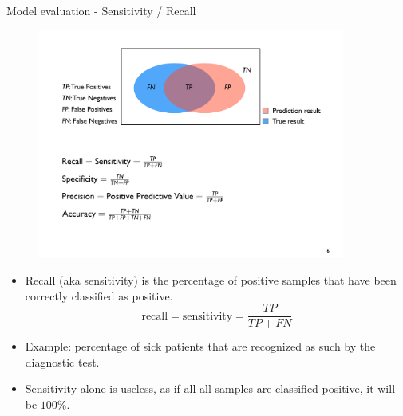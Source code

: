 \documentclass[xcolor=pdftex,dvipsnames,table]{beamer}
\begin{document}
\begin{frame}{Model evaluation - Sensitivity / Recall}
	\begin{figure}[htb]
		\includegraphics[width=0.9\textwidth]{../graphics/ModelEvaluation.pdf}
	\end{figure}
	\begin{itemize}
		\item Recall (aka sensitivity) is the percentage of positive samples that have been correctly classified as positive.
		\begin{equation}
			\text{recall} = \text{sensitivity} = \frac{TP}{TP + FN}
		\end{equation}
		\item Example: percentage of sick patients that are recognized as such by the diagnostic test.
		\item Sensitivity alone is useless, as if all all samples are classified positive, it will be $100\%$.
	\end{itemize}
\end{frame}
\end{document}
